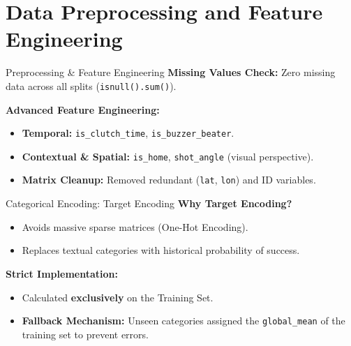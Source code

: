 \section{Data Preprocessing and Feature Engineering}

\begin{frame}{Preprocessing \& Feature Engineering}
    \textbf{Missing Values Check:} Zero missing data across all splits (\texttt{isnull().sum()}).
    \vspace{0.3cm}
    
    \textbf{Advanced Feature Engineering:}
    \begin{itemize}
        \item \textbf{Temporal:} \texttt{is\_clutch\_time}, \texttt{is\_buzzer\_beater}.
        \item \textbf{Contextual \& Spatial:} \texttt{is\_home}, \texttt{shot\_angle} (visual perspective).
        \item \textbf{Matrix Cleanup:} Removed redundant (\texttt{lat}, \texttt{lon}) and ID variables.
    \end{itemize}
\end{frame}

\begin{frame}{Categorical Encoding: Target Encoding}
    \textbf{Why Target Encoding?}
    \begin{itemize}
        \item Avoids massive sparse matrices (One-Hot Encoding).
        \item Replaces textual categories with historical probability of success.
    \end{itemize}
    \vspace{0.3cm}
    \textbf{Strict Implementation:}
    \begin{itemize}
        \item Calculated \textbf{exclusively} on the Training Set.
        \item \textbf{Fallback Mechanism:} Unseen categories assigned the \texttt{global\_mean} of the training set to prevent errors.
    \end{itemize}
\end{frame}

